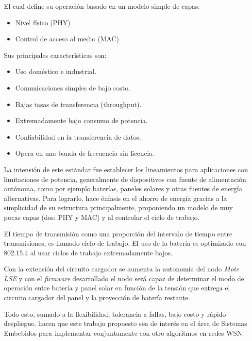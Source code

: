 El cual define su operación basado en un modelo simple de capas:
		\begin{itemize}
			\item Nivel físico (PHY)
			\item Control de acceso al medio (MAC)
		\end{itemize}

\noindent Sus principales características son:
		\begin{itemize}
			\item Uso doméstico e industrial.
			\item Comunicaciones simples de bajo costo. 
			\item Bajas tasas de transferencia (throughput).
			\item Extremadamente bajo consumo de potencia.
			\item Confiabilidad en la transferencia de datos.
			\item Opera en una banda de frecuencia sin licencia.
		\end{itemize}

La intensión de este estándar fue establecer los lineamientos para aplicaciones con limitaciones de potencia, generalmente de dispositivos con fuente de alimentación autónoma, como por ejemplo baterías, paneles solares y otras fuentes de energía alternativas. Para lograrlo, hace énfasis en el ahorro de energía gracias a la simplicidad de su estructura principalmente, proponiendo un modelo de muy pocas capas (dos: PHY y MAC) y al controlar el ciclo de trabajo.

El tiempo de transmisión como una proporción del intervalo de tiempo entre transmisiones, es llamado ciclo de trabajo. El uso de la batería es optimizado con 802.15.4 al usar ciclos de trabajo extremadamente bajos. 
		
Con la extensión del circuito cargador se aumenta la autonomía del nodo \textit{Mote LSE} y con el \textit{firmware} desarrollado el nodo será capaz de determinar el modo de operación entre batería y panel solar en función de la tensión que entrega el circuito cargador del panel y la proyección de batería restante.

Todo esto, sumado a la flexibilidad, tolerancia a fallas, bajo costo y rápido despliegue, hacen que este trabajo propuesto sea de interés en el área de Sistemas Embebidos para implementar conjuntamente con otro algoritmos en redes WSN.


